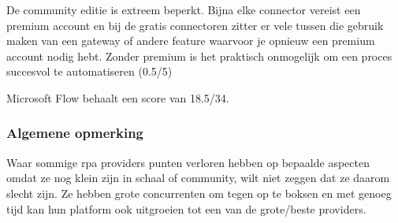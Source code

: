 De community editie is extreem beperkt. Bijna elke connector vereist een premium account en bij de gratis connectoren zitter er vele tussen die gebruik maken van een gateway of andere feature waarvoor je opnieuw een premium account nodig hebt. Zonder premium is het praktisch onmogelijk om een proces succesvol te automatiseren (0.5/5)

Microsoft Flow behaalt een score van 18.5/34.


\subsubsection{Algemene opmerking}
Waar sommige \acrshort{rpa} providers punten verloren hebben op bepaalde aspecten omdat ze nog klein zijn in schaal of community, wilt niet zeggen dat ze daarom slecht zijn. Ze hebben grote concurrenten om tegen op te boksen en met genoeg tijd kan hun platform ook uitgroeien tot een van de grote/beste providers.

